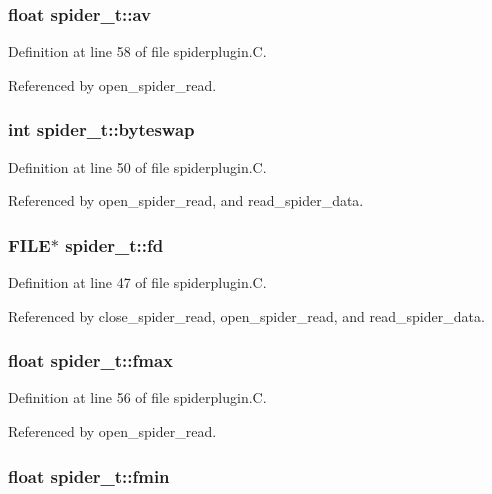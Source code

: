 \subsubsection{\setlength{\rightskip}{0pt plus 5cm}float spider\_\-t::av}\label{structspider__t_m11}




Definition at line 58 of file spiderplugin.C.

Referenced by open\_\-spider\_\-read.
\subsubsection{\setlength{\rightskip}{0pt plus 5cm}int spider\_\-t::byteswap}\label{structspider__t_m3}




Definition at line 50 of file spiderplugin.C.

Referenced by open\_\-spider\_\-read, and read\_\-spider\_\-data.
\subsubsection{\setlength{\rightskip}{0pt plus 5cm}FILE$\ast$ spider\_\-t::fd}\label{structspider__t_m0}




Definition at line 47 of file spiderplugin.C.

Referenced by close\_\-spider\_\-read, open\_\-spider\_\-read, and read\_\-spider\_\-data.
\subsubsection{\setlength{\rightskip}{0pt plus 5cm}float spider\_\-t::fmax}\label{structspider__t_m9}




Definition at line 56 of file spiderplugin.C.

Referenced by open\_\-spider\_\-read.
\subsubsection{\setlength{\rightskip}{0pt plus 5cm}float spider\_\-t::fmin}\label{structspider__t_m10}




